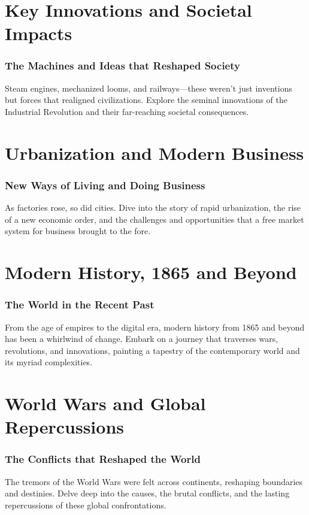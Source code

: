 \documentclass[a4paper,12pt]{book}
\begin{document}
\chapter{Key Innovations and Societal Impacts}
\subsection*{The Machines and Ideas that Reshaped Society}
Steam engines, mechanized looms, and railways—these weren't just inventions but forces that realigned civilizations. Explore the seminal innovations of the Industrial Revolution and their far-reaching societal consequences.

\chapter{Urbanization and Modern Business}
\subsection*{New Ways of Living and Doing Business}
As factories rose, so did cities. Dive into the story of rapid urbanization, the rise of a new economic order, and the challenges and opportunities that a free market system for business brought to the fore.

\chapter{Modern History, 1865 and Beyond}
\subsection*{The World in the Recent Past}
From the age of empires to the digital era, modern history from 1865 and beyond has been a whirlwind of change. Embark on a journey that traverses wars, revolutions, and innovations, painting a tapestry of the contemporary world and its myriad complexities.

\chapter{World Wars and Global Repercussions}
\subsection*{The Conflicts that Reshaped the World}
The tremors of the World Wars were felt across continents, reshaping boundaries and destinies. Delve deep into the causes, the brutal conflicts, and the lasting repercussions of these global confrontations.
\end{document}
